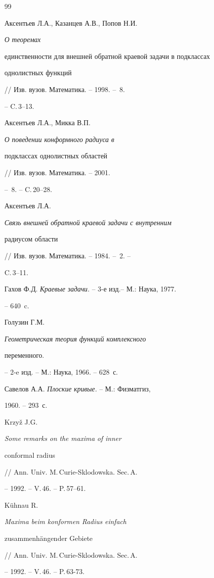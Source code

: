 \begin{thebibliography}{99}







Аксентьев Л.А., Казанцев А.В., Попов Н.И. {\it О теоремах


единственности для внешней обратной краевой задачи в подклассах


однолистных функций}// Изв. вузов. Математика. -- 1998. -- \No\,8.


-- C.\,3--13.




Аксентьев Л.А., Микка В.П. {\it О поведении конформного радиуса в


подклассах однолистных областей} // Изв. вузов. Математика. -- 2001.


-- \No\,8. -- C.\,20--28.




Аксентьев Л.А. {\it Связь внешней обратной краевой задачи с внутренним


радиусом области} // Изв. вузов. Математика. -- 1984. -- \No\,2. --


C.\,3--11.




Гахов Ф.Д. {\it Краевые задачи.} -- 3-е изд.-- М.: Наука, 1977.


-- 640~c.




Голузин Г.М. {\it Геометрическая теория функций комплексного


переменного.} -- 2-e изд. -- М.: Наука, 1966. -- 628~с.




Савелов А.А. {\it Плоские кривые.} -- М.: Физматгиз,


1960. -- 293~с.




Krzy\v z J.G. {\it Some remarks on the maxima of inner


conformal radius} // Ann. Univ. M.\,Curie-Sklodowska. Sec.\,A.


-- 1992. -- V.\,46. -- P.\,57--61.




K\"uhnau R. {\it Maxima beim konformen Radius einfach


zusammenh\"angender Gebiete} // Ann. Univ. M.\,Curie-Sklodowska. Sec.\,A.


-- 1992. -- V.\,46. -- P.\,63-73.



\end{thebibliography}
